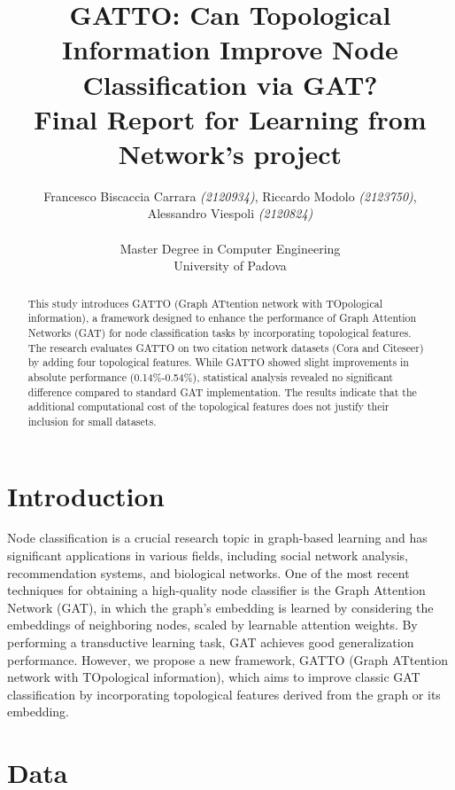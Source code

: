 \documentclass[12pt,conference]{ieeeconf} %
\title{GATTO: Can Topological Information Improve Node Classification via GAT?\\
\large Final Report for Learning from Network's project \\}
\author{Francesco Biscaccia Carrara \textit{(2120934)}, Riccardo Modolo \textit{(2123750)},\\ Alessandro Viespoli \textit{(2120824)} %
\\\\ Master Degree in Computer Engineering \\
University of Padova \\
}
\begin{document}
\maketitle
\thispagestyle{plain}
\pagestyle{plain}

\begin{abstract}
    This study introduces GATTO (Graph ATtention network with TOpological information), a framework designed to enhance the performance of Graph Attention Networks (GAT) for node classification tasks by incorporating topological features. The research evaluates GATTO on two citation network datasets (Cora and Citeseer) by adding four topological features. While GATTO showed slight improvements in absolute performance (0.14\%-0.54\%), statistical analysis revealed no significant difference compared to standard GAT implementation. The results indicate that the additional computational cost of the topological features does not justify their inclusion for small datasets.
\end{abstract}


\section{Introduction} 
Node classification is a crucial research topic in graph-based learning and has significant applications in various fields, including social network analysis, recommendation systems, and biological networks. One of the most recent techniques for obtaining a high-quality node classifier is the Graph Attention Network (GAT), in which the graph's embedding is learned by considering the embeddings of neighboring nodes, scaled by learnable attention weights. By performing a transductive learning task, GAT achieves good generalization performance. However, we propose a new framework, GATTO (Graph ATtention network with TOpological information), which aims to improve classic GAT classification by incorporating topological features derived from the graph or its embedding.

\section{Data} 
\end{document}
